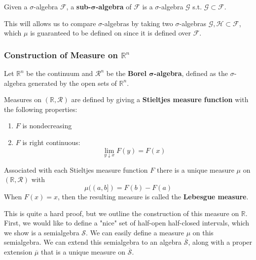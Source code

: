 \documentclass{article}
\begin{document}
    \begin{definition}
      Given a $\sigma$-algebra $\mathcal{F}$, a \textbf{sub-$\boldsymbol{\sigma}$-algebra} of $\mathcal{F}$ is a $\sigma$-algebra $\mathcal{G}$ s.t. $\mathcal{G} \subset \mathcal{F}$. 
    \end{definition}

    This will allows us to compare $\sigma$-algebras by taking two $\sigma$-algebras $\mathcal{G}, \mathcal{H} \subset \mathcal{F}$, which $\mu$ is guaranteed to be defined on since it is defined over $\mathcal{F}$. 

    \subsubsection[Construction of Measure on Rn]{Construction of Measure on $\mathbb{R}^n$}

    Let $\mathbb{R}^n$ be the continuum and $\mathcal{R}^n$ be the \textbf{Borel $\boldsymbol{\sigma}$-algebra}, defined as the $\sigma$-algebra generated by the open sets of $\mathbb{R}^n$. 

    \begin{example}
      Measures on $(\mathbb{R}, \mathcal{R})$ are defined by giving a \textbf{Stieltjes measure function} with the following properties: 
      \begin{enumerate}
        \item $F$ is nondecreasing 
        \item $F$ is right continuous: 
        \begin{equation}
          \lim_{y \downarrow x} F(y) = F(x)
        \end{equation}
      \end{enumerate}
    \end{example}

    \begin{theorem}
      Associated with each Stieltjes measure function $F$ there is a unique measure $\mu$ on $(\mathbb{R}, \mathcal{R})$ with 
      \begin{equation}
        \mu((a, b]) = F(b) - F(a)
      \end{equation}
      When $F(x) = x$, then the resulting measure is called the \textbf{Lebesgue measure}. 
    \end{theorem}

    This is quite a hard proof, but we outline the construction of this measure on $\mathbb{R}$. First, we would like to define a "nice" set of half-open half-closed intervals, which we show is a semialgebra $\mathcal{S}$. We can easily define a measure $\mu$ on this semialgebra. We can extend this semialgebra to an algebra $\overline{\mathcal{S}}$, along with a proper extension $\overline{\mu}$ that is a unique measure on $\overline{\mathcal{S}}$. 
\end{document}
